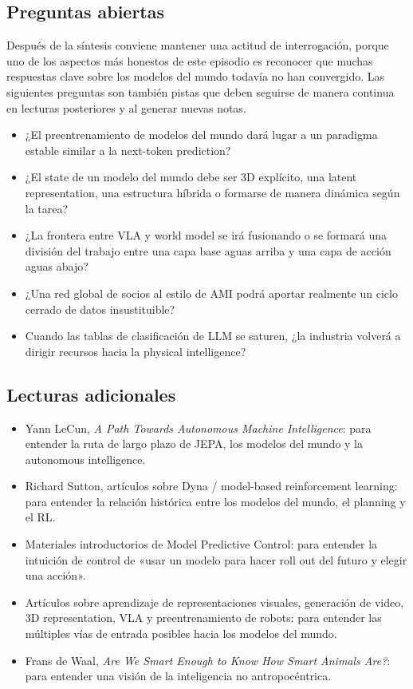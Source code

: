 \documentclass[a4paper]{article}
\begin{document}
\subsection{Preguntas abiertas}

Después de la síntesis conviene mantener una actitud de interrogación, porque uno de los aspectos más honestos de este episodio es reconocer que muchas respuestas clave sobre los modelos del mundo todavía no han convergido. Las siguientes preguntas son también pistas que deben seguirse de manera continua en lecturas posteriores y al generar nuevas notas.

\begin{itemize}
\item ¿El preentrenamiento de modelos del mundo dará lugar a un paradigma estable similar a la next-token prediction?
\item ¿El state de un modelo del mundo debe ser 3D explícito, una latent representation, una estructura híbrida o formarse de manera dinámica según la tarea?
\item ¿La frontera entre VLA y world model se irá fusionando o se formará una división del trabajo entre una capa base aguas arriba y una capa de acción aguas abajo?
\item ¿Una red global de socios al estilo de AMI podrá aportar realmente un ciclo cerrado de datos insustituible?
\item Cuando las tablas de clasificación de LLM se saturen, ¿la industria volverá a dirigir recursos hacia la physical intelligence?
\end{itemize}

\subsection{Lecturas adicionales}

\begin{itemize}
\item Yann LeCun, \textit{A Path Towards Autonomous Machine Intelligence}: para entender la ruta de largo plazo de JEPA, los modelos del mundo y la autonomous intelligence.
\item Richard Sutton, artículos sobre Dyna / model-based reinforcement learning: para entender la relación histórica entre los modelos del mundo, el planning y el RL.
\item Materiales introductorios de Model Predictive Control: para entender la intuición de control de «usar un modelo para hacer roll out del futuro y elegir una acción».
\item Artículos sobre aprendizaje de representaciones visuales, generación de video, 3D representation, VLA y preentrenamiento de robots: para entender las múltiples vías de entrada posibles hacia los modelos del mundo.
\item Frans de Waal, \textit{Are We Smart Enough to Know How Smart Animals Are?}: para entender una visión de la inteligencia no antropocéntrica.
\end{itemize}
\end{document}
